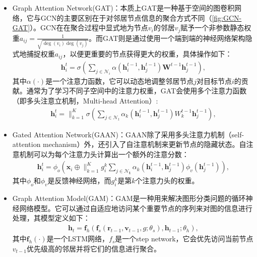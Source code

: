 \begin{itemize}
    \item Graph Attention Network(GAT)\cite{velivckovic2017graph}：本质上GAT是一种基于空间的图卷积网络，它与GCN的主要区别在于对邻居节点信息的聚合方式不同（\autoref{fig:GCN-GAT}）。GCN在在聚合过程中显式地为节点$v_i$的邻居$v_j$赋予一个非参数静态权重$a_{ij}=\frac{1}{\sqrt{\operatorname{deg}\left(v_{i}\right) \operatorname{deg}\left(v_{j}\right)}}$。而GAT则是通过使用一个端到端的神经网络架构隐式地捕捉权重$a_{ij}$，以便更重要的节点获得更大的权重，具体操作如下：
    \begin{align}
        \mathbf{h}_{i}^{t}=\sigma\left(\sum_{j \in \mathcal{N}_{i}} \alpha\left(\mathbf{h}_{i}^{t-1}, \mathbf{h}_{j}^{t-1}\right) \mathbf{W}^{t-1} \mathbf{h}_{j}^{t-1}\right),
    \end{align}
    其中$\alpha(\cdot)$是一个注意力函数，它可以动态地调整邻居节点$j$对目标节点$i$的贡献。通常为了学习不同子空间中的注意力权重，GAT会使用多个注意力函数（即多头注意立机制，Multi-head Attention）:
    \begin{align}
        \mathbf{h}_{i}^{t}=\|_{k=1}^{K} \sigma\left(\sum_{j \in \mathcal{N}_{t}} \alpha_{k}\left(\mathbf{h}_{i}^{t-1}, \mathbf{h}_{j}^{t-1}\right) W_{k}^{t-1} \mathbf{h}_{j}^{t-1}\right),
    \end{align}

    \item Gated Attention Network(GAAN)\cite{lee2017deep}\cite{zhang2018gaan}：GAAN除了采用多头注意力机制（self-attention mechanism）外，还引入了自注意机制来更新节点的隐藏状态。自注意机制可以为每个注意力头计算出一个额外的注意分数：
    \begin{align}
        \mathbf{h}_{i}^{t}=\phi_{o}\left(\mathbf{x}_{i} \oplus \|_{k=1}^{K} g_{i}^{k} \sum_{j \in \mathcal{N}_{\mathbf{t}}} \alpha_{k}\left(\mathbf{h}_{i}^{t-1}, \mathbf{h}_{j}^{t-1}\right) \phi_{v}\left(\mathbf{h}_{j}^{t-1}\right)\right),
    \end{align}
    其中$\phi_{o}\text{和}\phi_{v}$是反馈神经网络，而$g_{i}^{k}$是第$k$个注意力头的权重。
    \item Graph Attention Model(GAM)：GAM是一种用来解决图形分类问题的循环神经网络模型。它可以通过自适应地访问某个重要节点的序列来对图的信息进行处理，其模型定义如下：
    \begin{align}
        \mathbf{h}_{t}=\mathbf{f}_{h}\left(\mathbf{f}_{s}\left(\mathbf{r}_{t-1}, \mathbf{v}_{t-1}, g ; \theta_{s}\right), \mathbf{h}_{t-1} ; \theta_{h}\right),
    \end{align}
    其中$\mathbf{f}_{h}(\cdot)$是一个LSTM网络，$f_s$是一个step network，它会优先访问当前节点$v_{t-1}$优先级高的邻居并将它们的信息进行聚合。
\end{itemize}

